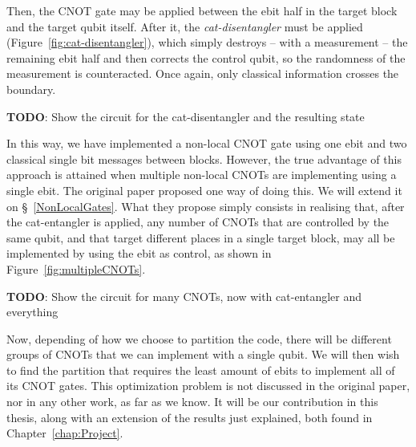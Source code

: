Then, the CNOT gate may be applied between the ebit half in the target block and the target qubit itself. After it, the \textit{cat-disentangler} must be applied (Figure~\ref{fig:cat-disentangler}), which simply destroys -- with a measurement -- the remaining ebit half and then corrects the control qubit, so the randomness of the measurement is counteracted. Once again, only classical information crosses the boundary.

\textbf{TODO}: Show the circuit for the cat-disentangler and the resulting state

In this way, we have implemented a non-local CNOT gate using one ebit and two classical single bit messages between blocks. However, the true advantage of this approach is attained when multiple non-local CNOTs are implementing using a single ebit. The original paper \citep{NonLocalCNOT} proposed one way of doing this. We will extend it on \S~\ref{NonLocalGates}. What they propose simply consists in realising that, after the cat-entangler is applied, any number of CNOTs that are controlled by the same qubit, and that target different places in a single target block, may all be implemented by using the ebit as control, as shown in Figure~\ref{fig:multipleCNOTs}.

\textbf{TODO}: Show the circuit for many CNOTs, now with cat-entangler and everything

Now, depending of how we choose to partition the code, there will be different groups of CNOTs that we can implement with a single qubit. We will then wish to find the partition that requires the least amount of ebits to implement all of its CNOT gates. This optimization problem is not discussed in the original paper, nor in any other work, as far as we know. It will be our contribution in this thesis, along with an extension of the results just explained, both found in Chapter~\ref{chap:Project}.